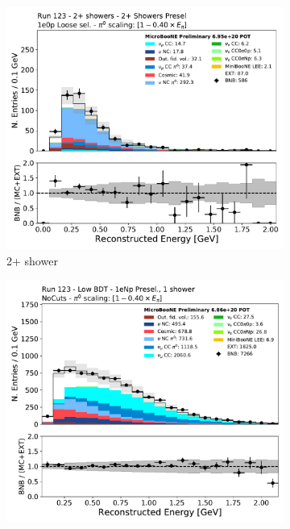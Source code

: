 \begin{figure}[H] 
\begin{center}
    \begin{subfigure}[b]{0.3\textwidth}
    \centering
    \includegraphics[width=1.00\textwidth]{Sidebands/Figures/TwoShr_1e0pSel_newSamples/reco_e_loose.pdf}
    \caption{\label{fig:datamccomparisons:nuepresel} 2+ shower \npsel}
    \end{subfigure}
    \begin{subfigure}[b]{0.3\textwidth}
    \centering
    \includegraphics[width=1.00\textwidth]{Sidebands/Figures/1eNp/LPID_NPOneShr_None_pi0e40/reco_e.pdf}

\end{subfigure}
\end{center}
\end{figure}
